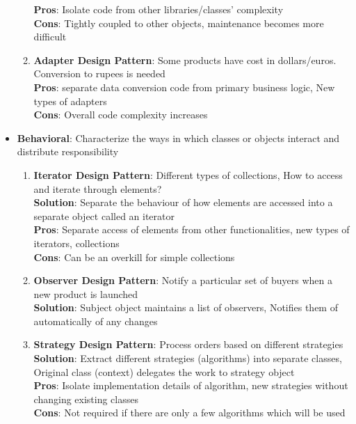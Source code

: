 \documentclass[a4paper]{article}
\begin{document}
\begin{itemize}
\begin{enumerate}
        \textbf{Pros}: Isolate code from other libraries/classes’ complexity\\
        \textbf{Cons}: Tightly coupled to other objects, maintenance becomes more difficult
        \item \textbf{Adapter Design Pattern}: Some products have cost in dollars/euros. Conversion to rupees is needed\\
        \textbf{Pros}: separate data conversion code from primary business logic, New types of adapters\\
        \textbf{Cons}: Overall code complexity increases
    \end{enumerate}
    \item \textbf{Behavioral}: Characterize the ways in which classes or objects interact and distribute responsibility
    \begin{enumerate}
        \item \textbf{Iterator Design Pattern}: Different types of collections, How to access and iterate through elements?\\
        \textbf{Solution}: Separate the behaviour of how elements are accessed into a separate object called an iterator\\
        \textbf{Pros}: Separate access of elements from other functionalities, new types of iterators, collections\\
        \textbf{Cons}: Can be an overkill for simple collections
        \item \textbf{Observer Design Pattern}: Notify a particular set of buyers when a new product is launched\\
        \textbf{Solution}: Subject object maintains a list of observers, Notifies them of automatically of any changes
        \item \textbf{Strategy Design Pattern}: Process orders based on different strategies\\
        \textbf{Solution}: Extract different strategies (algorithms) into separate classes, Original class (context) delegates the work to strategy object\\
        \textbf{Pros}: Isolate implementation details of algorithm, new strategies without changing existing classes\\
        \textbf{Cons}: Not required if there are only a few algorithms which will be used
    \end{enumerate}

\end{itemize}
\end{document}
